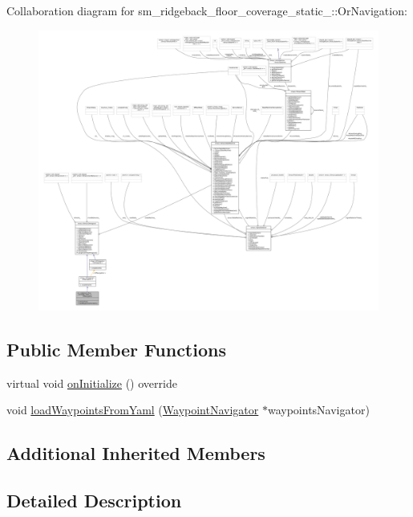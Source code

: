 Collaboration diagram for sm\+\_\+ridgeback\+\_\+floor\+\_\+coverage\+\_\+static\+\_\+:\+:Or\+Navigation\+:
\nopagebreak
\begin{figure}[H]
\begin{center}
\leavevmode
\includegraphics[width=350pt]{classsm__ridgeback__floor__coverage__static__1_1_1OrNavigation__coll__graph}
\end{center}
\end{figure}
\subsection*{Public Member Functions}
\begin{DoxyCompactItemize}
\item 
virtual void \hyperlink{classsm__ridgeback__floor__coverage__static__1_1_1OrNavigation_a1bb3bffac822d76afd68dfce4d93cadc}{on\+Initialize} () override
\item 
void \hyperlink{classsm__ridgeback__floor__coverage__static__1_1_1OrNavigation_a32f658f3d1ed7724f13fd30eb2139bbb}{load\+Waypoints\+From\+Yaml} (\hyperlink{classcl__move__base__z_1_1WaypointNavigator}{Waypoint\+Navigator} $\ast$waypoints\+Navigator)
\end{DoxyCompactItemize}
\subsection*{Additional Inherited Members}


\subsection{Detailed Description}


